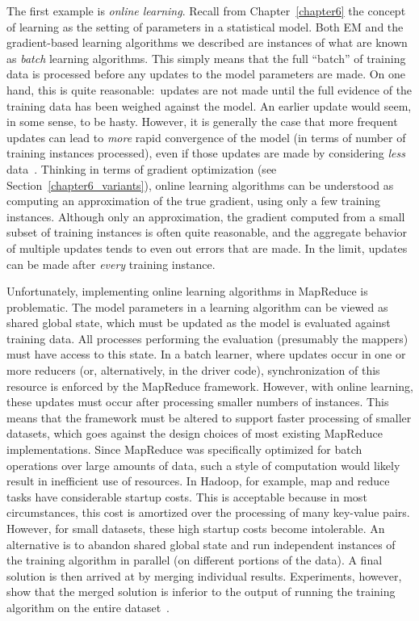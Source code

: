 The first example is \emph{online learning}.  Recall from
Chapter~\ref{chapter6} the concept of learning as the setting of
parameters in a statistical model.  Both EM and the gradient-based
learning algorithms we described are instances of what are known as
\emph{batch} learning algorithms.  This simply means that the full
``batch'' of training data is processed before any updates to the
model parameters are made.  On one hand, this is quite
reasonable:\ updates are not made until the full evidence of the
training data has been weighed against the model.  An earlier update
would seem, in some sense, to be hasty.  However, it is generally the
case that more frequent updates can lead to \emph{more} rapid
convergence of the model (in terms of number of training instances
processed), even if those updates are made by considering \emph{less}
data~\cite{Bottou_2004}.  Thinking in terms of gradient optimization
(see Section~\ref{chapter6_variants}), online learning algorithms can
be understood as computing an approximation of the true gradient,
using only a few training instances.  Although only an approximation,
the gradient computed from a small subset of training instances is
often quite reasonable, and the aggregate behavior of multiple updates
tends to even out errors that are made.  In the limit, updates can be
made after \emph{every} training instance.

Unfortunately, implementing online learning algorithms in MapReduce is
problematic.  The model parameters in a learning algorithm can be
viewed as shared global state, which must be updated as the model is
evaluated against training data.  All processes performing the
evaluation (presumably the mappers) must have access to this state.
In a batch learner, where updates occur in one or more reducers (or,
alternatively, in the driver code), synchronization of this resource
is enforced by the MapReduce framework.  However, with online
learning, these updates must occur after processing smaller numbers of
instances.  This means that the framework must be altered to support
faster processing of smaller datasets, which goes against the design
choices of most existing MapReduce implementations.  Since MapReduce
was specifically optimized for batch operations over large amounts of
data, such a style of computation would likely result in inefficient
use of resources.  In Hadoop, for example, map and reduce tasks have
considerable startup costs.  This is acceptable because in most
circumstances, this cost is amortized over the processing of many
key-value pairs.  However, for small datasets, these high startup
costs become intolerable.  An alternative is to abandon shared global
state and run independent instances of the training algorithm in
parallel (on different portions of the data).  A final solution is
then arrived at by merging individual results.  Experiments, however,
show that the merged solution is inferior to the output of running the
training algorithm on the entire dataset~\cite{Dredze_etal_2009}.

